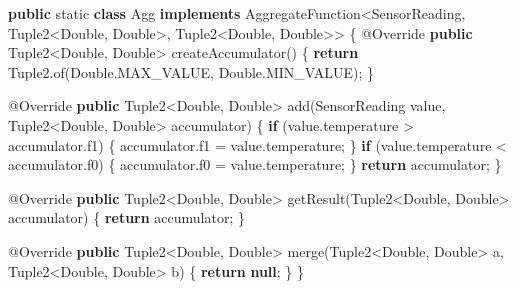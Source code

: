 \documentclass[cn,11pt,chinese]{elegantbook}
\newenvironment{Shaded}{}{}
\newcommand{\AttributeTok}[1]{\textcolor[rgb]{0.49,0.56,0.16}{#1}}
\newcommand{\BuiltInTok}[1]{#1}
\newcommand{\DataTypeTok}[1]{\textcolor[rgb]{0.56,0.13,0.00}{#1}}
\newcommand{\FunctionTok}[1]{\textcolor[rgb]{0.02,0.16,0.49}{#1}}
\newcommand{\KeywordTok}[1]{\textcolor[rgb]{0.00,0.44,0.13}{\textbf{#1}}}
\newcommand{\NormalTok}[1]{#1}
\begin{document}
\begin{Shaded}
\begin{Highlighting}[]
\KeywordTok{public} \DataTypeTok{static} \KeywordTok{class}\NormalTok{ Agg }\KeywordTok{implements}\NormalTok{ AggregateFunction\textless{}SensorReading, Tuple2\textless{}}\BuiltInTok{Double}\NormalTok{, }\BuiltInTok{Double}\NormalTok{\textgreater{}, Tuple2\textless{}}\BuiltInTok{Double}\NormalTok{, }\BuiltInTok{Double}\NormalTok{\textgreater{}\textgreater{} \{}
    \AttributeTok{@Override}
    \KeywordTok{public}\NormalTok{ Tuple2\textless{}}\BuiltInTok{Double}\NormalTok{, }\BuiltInTok{Double}\NormalTok{\textgreater{} }\FunctionTok{createAccumulator}\NormalTok{() \{}
        \KeywordTok{return}\NormalTok{ Tuple2.}\FunctionTok{of}\NormalTok{(}\BuiltInTok{Double}\NormalTok{.}\FunctionTok{MAX\_VALUE}\NormalTok{, }\BuiltInTok{Double}\NormalTok{.}\FunctionTok{MIN\_VALUE}\NormalTok{);}
\NormalTok{    \}}

    \AttributeTok{@Override}
    \KeywordTok{public}\NormalTok{ Tuple2\textless{}}\BuiltInTok{Double}\NormalTok{, }\BuiltInTok{Double}\NormalTok{\textgreater{} }\FunctionTok{add}\NormalTok{(SensorReading value, Tuple2\textless{}}\BuiltInTok{Double}\NormalTok{, }\BuiltInTok{Double}\NormalTok{\textgreater{} accumulator) \{}
        \KeywordTok{if}\NormalTok{ (value.}\FunctionTok{temperature}\NormalTok{ \textgreater{} accumulator.}\FunctionTok{f1}\NormalTok{) \{}
\NormalTok{            accumulator.}\FunctionTok{f1}\NormalTok{ = value.}\FunctionTok{temperature}\NormalTok{;}
\NormalTok{        \}}
        \KeywordTok{if}\NormalTok{ (value.}\FunctionTok{temperature}\NormalTok{ \textless{} accumulator.}\FunctionTok{f0}\NormalTok{) \{}
\NormalTok{            accumulator.}\FunctionTok{f0}\NormalTok{  = value.}\FunctionTok{temperature}\NormalTok{;}
\NormalTok{        \}}
        \KeywordTok{return}\NormalTok{ accumulator;}
\NormalTok{    \}}

    \AttributeTok{@Override}
    \KeywordTok{public}\NormalTok{ Tuple2\textless{}}\BuiltInTok{Double}\NormalTok{, }\BuiltInTok{Double}\NormalTok{\textgreater{} }\FunctionTok{getResult}\NormalTok{(Tuple2\textless{}}\BuiltInTok{Double}\NormalTok{, }\BuiltInTok{Double}\NormalTok{\textgreater{} accumulator) \{}
        \KeywordTok{return}\NormalTok{ accumulator;}
\NormalTok{    \}}

    \AttributeTok{@Override}
    \KeywordTok{public}\NormalTok{ Tuple2\textless{}}\BuiltInTok{Double}\NormalTok{, }\BuiltInTok{Double}\NormalTok{\textgreater{} }\FunctionTok{merge}\NormalTok{(Tuple2\textless{}}\BuiltInTok{Double}\NormalTok{, }\BuiltInTok{Double}\NormalTok{\textgreater{} a, Tuple2\textless{}}\BuiltInTok{Double}\NormalTok{, }\BuiltInTok{Double}\NormalTok{\textgreater{} b) \{}
        \KeywordTok{return} \KeywordTok{null}\NormalTok{;}
\NormalTok{    \}}
\NormalTok{\}}
\end{Highlighting}
\end{Shaded}
\end{document}
